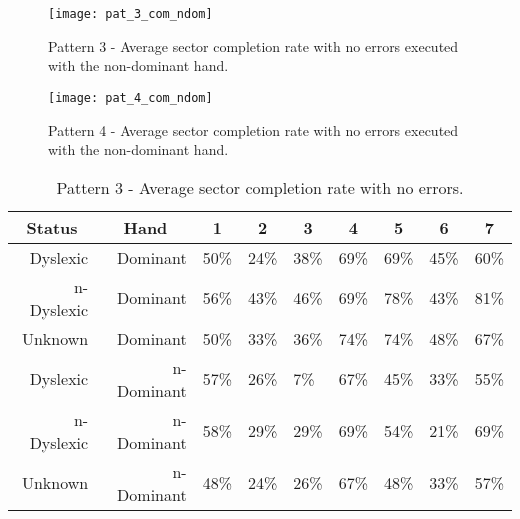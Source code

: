 		\begin{figure}[]
			\centering
			\texttt{[image: pat\_3\_com\_ndom]}
			\caption{Pattern 3 - Average sector completion rate with no errors executed with the non-dominant hand.}
			\label{fig_pat_3_com_ndom}
		\end{figure}		
		
		\begin{figure}[]
			\centering
			\texttt{[image: pat\_4\_com\_ndom]}
			\caption{Pattern 4 - Average sector completion rate with no errors executed with the non-dominant hand.}
			\label{fig_pat_4_com_ndom}
		\end{figure}
	
	
		\begin{table}[]
			\centering
			\caption{Pattern 3 - Average sector completion rate with no errors.}
			\label{tab_pat_3_com}
			\begin{tabularx}{\textwidth}{|r|r|X|X|X|X|X|X|X|}
				\hline
				\multicolumn{1}{|c|}{\textbf{Status}} & \multicolumn{1}{c|}{\textbf{Hand}} & \multicolumn{1}{c|}{\textbf{1}} & \multicolumn{1}{c|}{\textbf{2}} & \multicolumn{1}{c|}{\textbf{3}} & \multicolumn{1}{c|}{\textbf{4}} & \multicolumn{1}{c|}{\textbf{5}} & \multicolumn{1}{c|}{\textbf{6}} & \multicolumn{1}{c|}{\textbf{7}} \\ \hline
				Dyslexic                              & Dominant                           & 50\%       & 24\%       & 38\%       & 69\%       & 69\%       & 45\%       & 60\%       \\ \hline
				n-Dyslexic                          & Dominant                           & 56\%       & 43\%       & 46\%       & 69\%       & 78\%       & 43\%       & 81\%       \\ \hline
				Unknown                     & Dominant                           & 50\%       & 33\%       & 36\%       & 74\%       & 74\%       & 48\%       & 67\%       \\ \hline
				Dyslexic                              & n-Dominant                       & 57\%       & 26\%       & 7\%        & 67\%       & 45\%       & 33\%       & 55\%       \\ \hline
				n-Dyslexic                          & n-Dominant                       & 58\%       & 29\%       & 29\%       & 69\%       & 54\%       & 21\%       & 69\%       \\ \hline
				Unknown                    & n-Dominant                       & 48\%       & 24\%       & 26\%       & 67\%       & 48\%       & 33\%       & 57\%       \\ \hline
			\end{tabularx}
		\end{table}

